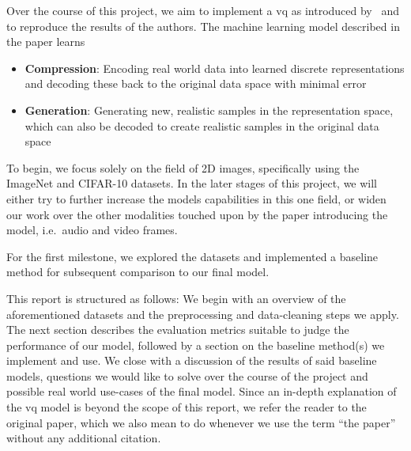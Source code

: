 Over the course of this project, we aim to implement a \ac{vq} as introduced by~\cite{vqvae}
and to reproduce the results of the authors.
The machine learning model described in the paper learns
\begin{itemize}
    \item \textbf{Compression}: Encoding real world data into learned discrete representations and decoding
    these back to the original data space with minimal error
    \item \textbf{Generation}: Generating new, realistic samples in the representation space, which can also be
    decoded to create realistic samples in the original data space
\end{itemize}
To begin, we focus solely on the field of 2D images, specifically using the ImageNet and CIFAR-10 datasets.
In the later stages of this project, we will either try to further increase the models capabilities in this one field,
or widen our work over the other modalities touched upon by the paper introducing the model, i.e.\ audio and video
frames.

For the first milestone, we explored the datasets and implemented a baseline method for subsequent comparison to our
final model.

This report is structured as follows: We begin with an overview of the aforementioned datasets and the preprocessing and
data-cleaning steps we apply.
The next section describes the evaluation metrics suitable to judge the performance of our model, followed by a
section on the baseline method(s) we implement and use.
We close with a discussion of the results of said baseline models, questions we would like to solve over the course of
the project and possible real world use-cases of the final model.
Since an in-depth explanation of the \ac{vq} model is beyond the scope of this report, we refer the reader to the
original paper,
which we also mean to do whenever we use the term ``the paper'' without any additional citation.